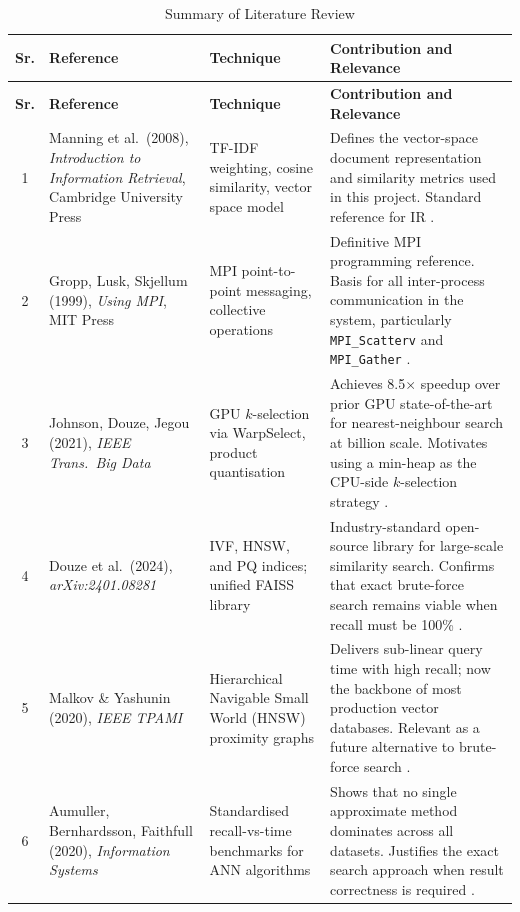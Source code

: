 \documentclass[12pt,a4paper]{article}
\begin{document}
\begin{longtable}{|c|p{3.2cm}|p{4.0cm}|p{6.8cm}|}
\caption{Summary of Literature Review}
\label{tab:litreview}\\
\hline
\textbf{Sr.} & \textbf{Reference} & \textbf{Technique} & \textbf{Contribution and Relevance} \\
\hline
\endfirsthead
\hline
\textbf{Sr.} & \textbf{Reference} & \textbf{Technique} & \textbf{Contribution and Relevance} \\
\hline
\endhead
\hline
\endfoot

1 &
Manning et al.\ (2008), \textit{Introduction to Information Retrieval},
Cambridge University Press &
TF-IDF weighting, cosine similarity, vector space model &
Defines the vector-space document representation and similarity metrics
used in this project. Standard reference for IR \cite{manning2008}. \\
\hline

2 &
Gropp, Lusk, Skjellum (1999), \textit{Using MPI}, MIT Press &
MPI point-to-point messaging, collective operations &
Definitive MPI programming reference. Basis for all inter-process
communication in the system, particularly \texttt{MPI\_Scatterv} and
\texttt{MPI\_Gather} \cite{gropp1999mpi}. \\
\hline

3 &
Johnson, Douze, Jegou (2021), \textit{IEEE Trans.\ Big Data} &
GPU $k$-selection via WarpSelect, product quantisation &
Achieves 8.5$\times$ speedup over prior GPU state-of-the-art for
nearest-neighbour search at billion scale. Motivates using a min-heap
as the CPU-side $k$-selection strategy \cite{johnson2021faiss}. \\
\hline

4 &
Douze et al.\ (2024), \textit{arXiv:2401.08281} &
IVF, HNSW, and PQ indices; unified FAISS library &
Industry-standard open-source library for large-scale similarity search.
Confirms that exact brute-force search remains viable when recall must
be 100\% \cite{douze2024faiss}. \\
\hline

5 &
Malkov \& Yashunin (2020), \textit{IEEE TPAMI} &
Hierarchical Navigable Small World (HNSW) proximity graphs &
Delivers sub-linear query time with high recall; now the backbone of
most production vector databases. Relevant as a future alternative to
brute-force search \cite{malkov2020hnsw}. \\
\hline

6 &
Aumuller, Bernhardsson, Faithfull (2020), \textit{Information Systems} &
Standardised recall-vs-time benchmarks for ANN algorithms &
Shows that no single approximate method dominates across all datasets.
Justifies the exact search approach when result correctness is
required \cite{aumuller2020ann}. \\
\hline


\end{longtable}
\end{document}
